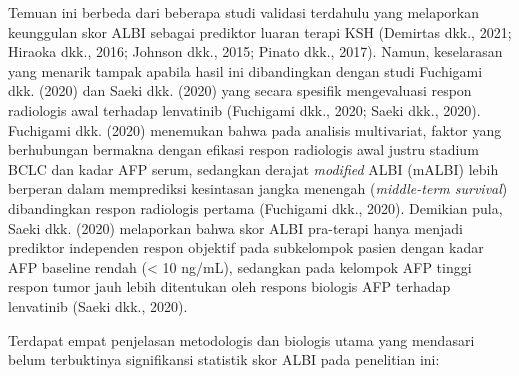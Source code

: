 \documentclass[
  indonesian,
]{report}
\begin{document}
Temuan ini berbeda dari beberapa studi validasi terdahulu yang
melaporkan keunggulan skor ALBI sebagai prediktor luaran terapi KSH
(Demirtas dkk., 2021; Hiraoka dkk., 2016; Johnson dkk., 2015; Pinato
dkk., 2017). Namun, keselarasan yang menarik tampak apabila hasil ini
dibandingkan dengan studi Fuchigami dkk. (2020) dan Saeki dkk. (2020)
yang secara spesifik mengevaluasi respon radiologis awal terhadap
lenvatinib (Fuchigami dkk., 2020; Saeki dkk., 2020). Fuchigami dkk.
(2020) menemukan bahwa pada analisis multivariat, faktor yang
berhubungan bermakna dengan efikasi respon radiologis awal justru
stadium BCLC dan kadar AFP serum, sedangkan derajat \emph{modified} ALBI
(mALBI) lebih berperan dalam memprediksi kesintasan jangka menengah
(\emph{middle-term survival}) dibandingkan respon radiologis pertama
(Fuchigami dkk., 2020). Demikian pula, Saeki dkk. (2020) melaporkan
bahwa skor ALBI pra-terapi hanya menjadi prediktor independen respon
objektif pada subkelompok pasien dengan kadar AFP baseline rendah
(\textless{} 10 ng/mL), sedangkan pada kelompok AFP tinggi respon tumor
jauh lebih ditentukan oleh respons biologis AFP terhadap lenvatinib
(Saeki dkk., 2020).

Terdapat empat penjelasan metodologis dan biologis utama yang mendasari
belum terbuktinya signifikansi statistik skor ALBI pada penelitian ini:
\end{document}
